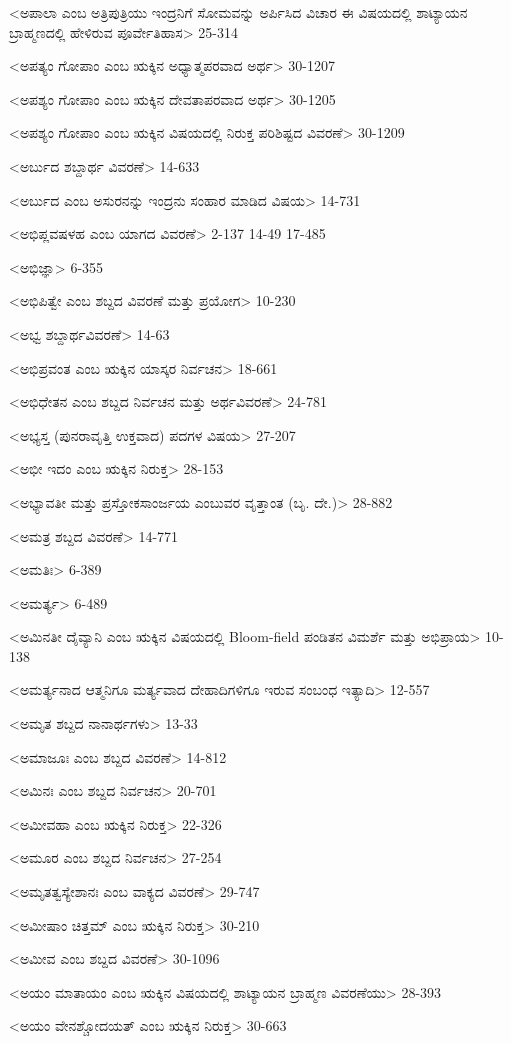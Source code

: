 <ಅಪಾಲಾ ಎಂಬ ಅತ್ರಿಪುತ್ರಿಯು ಇಂದ್ರನಿಗೆ ಸೋಮವನ್ನು ಅರ್ಪಿಸಿದ ವಿಚಾರ ಈ ವಿಷಯದಲ್ಲಿ ಶಾಟ್ಯಾಯನ ಬ್ರಾಹ್ಮಣದಲ್ಲಿ ಹೇಳಿರುವ ಪೂರ್ವೇತಿಹಾಸ>
25-314

<ಅಪತ್ಯಂ ಗೋಪಾಂ ಎಂಬ ಋಕ್ಕಿನ ಅಧ್ಯಾತ್ಮಪರವಾದ ಅರ್ಥ>
30-1207

<ಅಪಶ್ಯಂ ಗೋಪಾಂ ಎಂಬ ಋಕ್ಕಿನ ದೇವತಾಪರವಾದ ಅರ್ಥ>
30-1205

<ಅಪಶ್ಯಂ ಗೋಪಾಂ ಎಂಬ ಋಕ್ಕಿನ ವಿಷಯದಲ್ಲಿ ನಿರುಕ್ತ ಪರಿಶಿಷ್ಟದ ವಿವರಣೆ>
30-1209

<ಅರ್ಬುದ ಶಬ್ದಾರ್ಥ ವಿವರಣೆ>
14-633

<ಅರ್ಬುದ ಎಂಬ ಅಸುರನನ್ನು ಇಂದ್ರನು ಸಂಹಾರ ಮಾಡಿದ ವಿಷಯ>
14-731

<ಅಭಿಪ್ಲವಷಳಹ ಎಂಬ ಯಾಗದ ವಿವರಣೆ>
2-137 
14-49
17-485

<ಅಭಿಜ್ಞಾ>
6-355

<ಅಭಿಪಿತ್ವೇ ಎಂಬ ಶಬ್ದದ ವಿವರಣೆ ಮತ್ತು ಪ್ರಯೋಗ>
10-230

<ಅಭ್ವ ಶಬ್ದಾರ್ಥವಿವರಣೆ>
14-63

<ಅಭಿಪ್ರವಂತ ಎಂಬ ಋಕ್ಕಿನ ಯಾಸ್ಕರ ನಿರ್ವಚನ>
18-661

<ಅಭಿಧೇತನ ಎಂಬ ಶಬ್ದದ ನಿರ್ವಚನ ಮತ್ತು ಅರ್ಥವಿವರಣೆ>
24-781

<ಅಭ್ಯಸ್ತ (ಪುನರಾವೃತ್ತಿ ಉಕ್ತವಾದ) ಪದಗಳ ವಿಷಯ>
27-207

<ಅಭೀ ಇದಂ ಎಂಬ ಋಕ್ಕಿನ ನಿರುಕ್ತ>
28-153


<ಅಭ್ಯಾವತೀ ಮತ್ತು ಪ್ರಸ್ತೋಕಸಾಂರ್ಜಯ ಎಂಬುವರ ವೃತ್ತಾಂತ (ಬೃ. ದೇ.)>
28-882

<ಅಮತ್ರ ಶಬ್ದದ ವಿವರಣೆ>
14-771

<ಅಮತಿಃ>
6-389

<ಅಮರ್ತ್ಯ>
6-489

<ಅಮಿನತೀ ದೈವ್ಯಾನಿ ಎಂಬ ಋಕ್ಕಿನ ವಿಷಯದಲ್ಲಿ Bloom-field ಪಂಡಿತನ ವಿಮರ್ಶೆ ಮತ್ತು ಅಭಿಪ್ರಾಯ>
10-138

<ಅಮರ್ತ್ಯನಾದ ಆತ್ಮನಿಗೂ ಮರ್ತ್ಯವಾದ ದೇಹಾದಿಗಳಿಗೂ ಇರುವ ಸಂಬಂಧ ಇತ್ಯಾದಿ>
12-557

<ಅಮೃತ ಶಬ್ದದ ನಾನಾರ್ಥಗಳು>
13-33

<ಅಮಾಜೂಃ ಎಂಬ ಶಬ್ದದ ವಿವರಣೆ>
14-812

<ಅಮಿನಃ ಎಂಬ ಶಬ್ದದ ನಿರ್ವಚನ>
20-701

<ಅಮೀವಹಾ ಎಂಬ ಋಕ್ಕಿನ ನಿರುಕ್ತ>
22-326

<ಅಮೂರ ಎಂಬ ಶಬ್ದದ ನಿರ್ವಚನ>
27-254

<ಅಮೃತತ್ವಸ್ಯೇಶಾನಃ ಎಂಬ ವಾಕ್ಯದ ವಿವರಣೆ>
29-747

<ಅಮೀಷಾಂ ಚಿತ್ತಮ್ ಎಂಬ ಋಕ್ಕಿನ ನಿರುಕ್ತ>
30-210

<ಅಮೀವ ಎಂಬ ಶಬ್ದದ ವಿವರಣೆ>
30-1096

<ಅಯಂ ಮಾತಾಯಂ ಎಂಬ ಋಕ್ಕಿನ ವಿಷಯದಲ್ಲಿ ಶಾಟ್ಯಾಯನ ಬ್ರಾಹ್ಮಣ ವಿವರಣೆಯು>
28-393

<ಅಯಂ ವೇನಶ್ಚೋದಯತ್‍ ಎಂಬ ಋಕ್ಕಿನ ನಿರುಕ್ತ>
30-663

